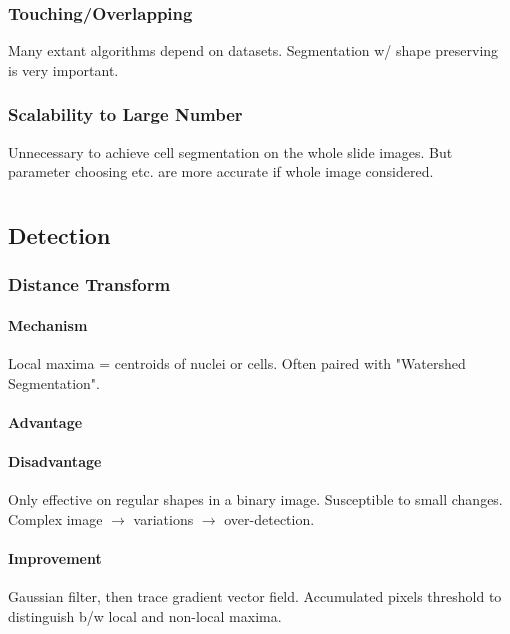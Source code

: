 \documentclass[10pt,a4paper]{article}
\begin{document}
\subsubsection{Touching/Overlapping}
Many extant algorithms depend on datasets. Segmentation w/ shape preserving is very important.
\subsubsection{Scalability to Large Number}
Unnecessary to achieve cell segmentation on the whole slide images. But parameter choosing etc. are more accurate if whole image considered.


\section{\cite{Chen2013}}

\section{\cite{Xing2016}}

\subsection{Detection}

\subsubsection{Distance Transform}
\paragraph{Mechanism}Local maxima = centroids of nuclei or cells. Often paired with "Watershed Segmentation".
\paragraph{Advantage}
\paragraph{Disadvantage}Only effective on regular shapes in a binary image. Susceptible to small changes. Complex image $\to$ variations $\to$ over-detection.
\paragraph{Improvement}Gaussian filter, then trace gradient vector field. Accumulated pixels threshold to distinguish b/w local and non-local maxima.
\end{document}
